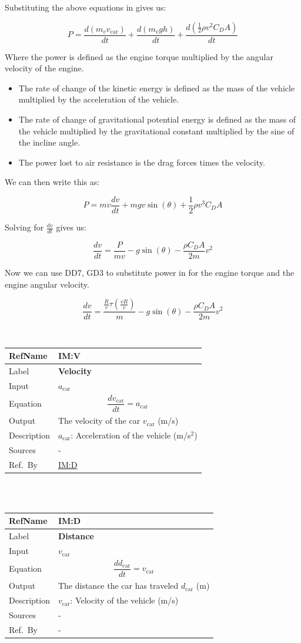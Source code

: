 \documentclass[12pt]{article}
\newcommand{\colAwidth}{0.13\textwidth}
\newcommand{\colBwidth}{0.82\textwidth}
\newcommand{\hpref}[1]{\hyperref[#1]{#1}}
\newcommand{\definstance}[8] {
~\newline
\noindent
\begin{minipage}{\textwidth}
\renewcommand*{\arraystretch}{1.5}
\begin{tabular}{| p{\colAwidth} | p{\colBwidth}|}
  \hline
  \rowcolor[gray]{0.9}
  RefName& \textbf{#1} \label{#1}\\
  \hline
  Label& \bf #2 \\
  \hline
  Input& #3\\
  \hline
  Equation& #4\\
  \hline
  Output& #5\\
  \hline
  Description& #6 \\
  \hline
  Sources& #7 \\
  \hline
  Ref.\ By & #8\\
  \hline
\end{tabular}
\end{minipage}\\
}
\begin{document}
Substituting the above equations in gives us:

\[
P = \frac{d(m_v v_\text{car})}{dt} + \frac{d(m_v g h)}{dt} + \frac{d(\frac{1}{2} \rho v^2 C_D A)}{dt} 
\]
  
Where the power is defined as the engine torque multiplied by the angular velocity of the engine. 
\begin{itemize}
\item The rate of change of the kinetic energy is defined as the mass of the vehicle multiplied by the acceleration of the vehicle.
\item The rate of change of gravitational potential energy is defined as the mass of the vehicle multiplied by the gravitational constant multiplied by the sine of the incline angle.
\item The power lost to air resistance is the drag forces times the velocity.
\end{itemize}

We can then write this as:

\[
P = mv\frac{dv}{dt} + mgv\sin(\theta) + \frac{1}{2} \rho v^3 C_D A
\]

Solving for $\frac{dv}{dt}$ gives us:

\[
\frac{dv}{dt} = \frac{P}{mv} - g\sin(\theta) - \frac{\rho C_D A}{2m} v^2 
\]

Now we can use DD7, GD3 to substitute power in for the engine torque and the engine angular velocity.

\[
\frac{dv}{dt} = \frac{\frac{R}{r} \tau(\frac{v R}{r})}{m} - g\sin(\theta) - \frac{\rho C_D A}{2m} v^2
\]



\definstance
{IM:V}
{Velocity}
{$a_\text{car}$}
{\[
\frac{dv_\text{car}}{dt} = a_\text{car}
\]}
{The velocity of the car $v_\text{car}$ (m/s)}
{$a_\text{car}$: Acceleration of the vehicle (m/s$^2$)}
{-}
{\hpref{IM:D}}

\definstance
{IM:D}
{Distance}
{$v_\text{car}$}
{\[
\frac{dd_\text{car}}{dt} = v_\text{car}
\]}
{The distance the car has traveled $d_\text{car}$ (m)}
{$v_\text{car}$: Velocity of the vehicle (m/s)}
{-}
{-}
\end{document}
